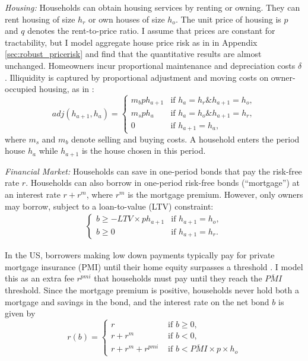 \documentclass[12pt]{article}
\begin{document}
\textit{Housing:} Households can obtain housing services by renting or owning. They can rent housing of size $h_r$ or own houses of size $h_o$. The unit price of housing is $p$ and $q$ denotes the rent-to-price ratio. I assume that prices are constant for tractability, but I model aggregate house price risk as in \cite{Corbae2015} in Appendix \ref{sec:robust_pricerisk} and find that the quantitative results are almost unchanged. Homeowners incur proportional maintenance and depreciation costs $\delta$. Illiquidity is captured by proportional adjustment and moving costs on owner-occupied housing, as in \cite{Yang2009}:
\begin{equation}\label{eq:transcost}
adj(h_{a+1},h_a) = \begin{cases}
m_b p h_{a+1} & \text{if } h_{a}=h_r\mathbin{\&} h_{a+1}= h_o, \\
m_s p h_a 	& \text{if } h_a = h_o\mathbin{\&}h_{a+1}=h_r, \\
0 & \text{if } h_{a+1} = h_a,
\end{cases}
\end{equation} where $m_s$ and $m_b$ denote selling and buying costs. A household enters the period house $h_a$ while $h_{a+1}$ is the house chosen in this period. 



\textit{Financial Market:} Households can save in one-period bonds that pay the risk-free rate $r$. Households can also borrow in one-period risk-free bonds (``mortgage'') at an interest rate $r + r^m$, where $r^m$ is the mortgage premium. However, only owners may borrow, subject to a loan-to-value (LTV) constraint:
\begin{align*}
\begin{cases}
b\ge - LTV \times p h_{a+1} & \text{if } h_{a+1} = h_o, \\ 
b\ge 0 & \text{if } h_{a+1} = h_r.
\end{cases}
\end{align*}

In the US, borrowers making low down payments typically pay for private mortgage insurance (PMI) until their home equity surpasses a threshold \citep{goodman2017sixty}. I model this as an extra fee $r^{pmi}$ that households must pay until they reach the $\overline{PMI}$ threshold. Since the mortgage premium is positive, households never hold both a mortgage and savings in the bond, and the interest rate on the net bond $b$ is given by
\begin{equation}\label{eq:rb}
r(b) = \begin{cases}
r & \text{ if } b\ge0, \\
r +r^m & \text{ if } b<0, \\
r +r^m +r^{pmi}& \text{ if } b < \overline{PMI}\times p\times h_o
\end{cases}
\end{equation}
\end{document}

